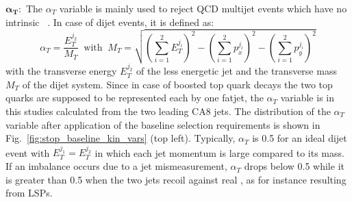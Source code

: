 \begin{description}
 \item $\mathbf{\alpha_T:}$ The $\alpha_T$ variable is mainly used to reject QCD multijet events which have no intrinsic \met~\cite{Chatrchyan:2012wa, Chatrchyan:2013lya}. In case of dijet events, it is defined as:
\begin{equation}
 \alpha_T = \frac{E_T^{j_2}}{M_T} \;\; \mathrm{with} \;\; M_T = \sqrt{\left( \sum_{i=1}^{2} E_T^{j_i} \right)^2 - \left( \sum_{i=1}^{2} p_x^{j_i} \right)^2 - \left( \sum_{i=1}^{2} p_y^{j_i} \right)^2}
\end{equation}
with the transverse energy $E_T^{j_2}$ of the less energetic jet and the transverse mass $M_T$ of the dijet system. Since in case of boosted top quark decays the two top quarks are supposed to be represented each by one fatjet, the $\alpha_T$ variable is in this studies calculated from the two leading CA8 jets. The distribution of the $\alpha_T$ variable after application of the baseline selection requirements is shown in Fig.~\ref{fig:stop_baseline_kin_vars} (top left). Typically, $\alpha_T$ is 0.5 for an ideal dijet event with $E_T^{j_1} = E_T^{j_2}$ in which each jet momentum is large compared to its mass. If an imbalance occurs due to a jet mismeasurement, $\alpha_T$ drops below 0.5 while it is greater than 0.5 when the two jets recoil against real \met, as for instance resulting from LSPs.


\end{description}
